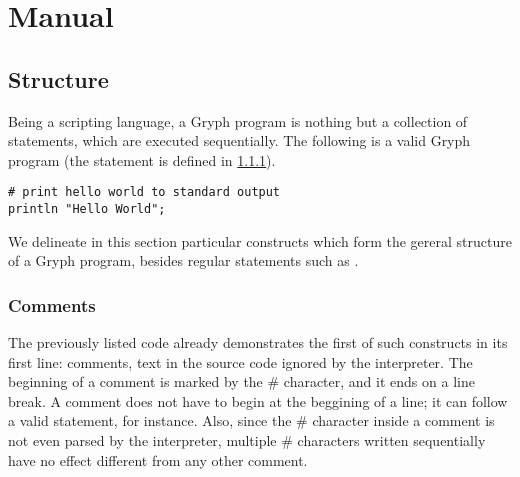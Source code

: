 \section{Manual}
\label{sec:manual}

\subsection{Structure}
Being a scripting language, a Gryph program is nothing but a collection of statements, which are executed sequentially. The following is a valid Gryph program (the  statement is defined in \ref{}).

\begin{lstlisting}[language=Gryph]
# print hello world to standard output
println "Hello World";
\end{lstlisting}

We delineate in this section particular constructs which form the gereral structure of a Gryph program, besides regular statements such as .

\subsubsection{Comments}
The previously listed code already demonstrates the first of such constructs in its first line: comments, text in the source code ignored by the interpreter. The beginning of a comment is marked by the \# character, and it ends on a line break. A comment does not have to begin at the beggining of a line; it can follow a valid statement, for instance. Also, since the \# character inside a comment is not even parsed by the interpreter, multiple \# characters written sequentially have no effect different from any other comment.

